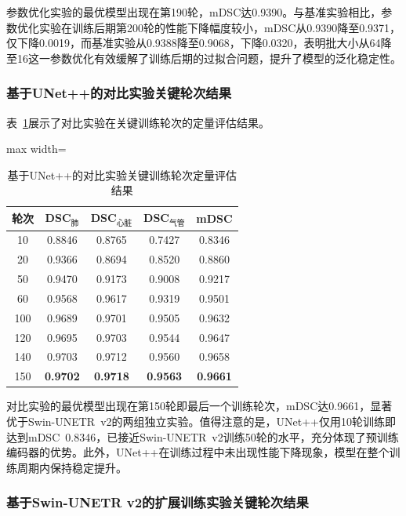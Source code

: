 \documentclass[12pt, a4paper]{article}
\begin{document}
参数优化实验的最优模型出现在第190轮，mDSC达0.9390。与基准实验相比，参数优化实验在训练后期第200轮的性能下降幅度较小，mDSC从0.9390降至0.9371，仅下降0.0019，而基准实验从0.9388降至0.9068，下降0.0320，表明批大小从64降至16这一参数优化有效缓解了训练后期的过拟合问题，提升了模型的泛化稳定性。

\subsubsection{基于UNet++的对比实验关键轮次结果}

表~\ref{tab:results_exp3}展示了对比实验在关键训练轮次的定量评估结果。

\begin{table}[H]
    \centering
    \caption{基于UNet++的对比实验关键训练轮次定量评估结果}
    \label{tab:results_exp3}
    \small
    \begin{adjustbox}{max width=\textwidth}
    \begin{tabular}{@{}ccccc@{}}
        \toprule
        \textbf{轮次} & \textbf{DSC$_\text{肺}$} & \textbf{DSC$_\text{心脏}$} & \textbf{DSC$_\text{气管}$} & \textbf{mDSC} \\
        \midrule
        10 & 0.8846 & 0.8765 & 0.7427 & 0.8346 \\
        20 & 0.9366 & 0.8694 & 0.8520 & 0.8860 \\
        50 & 0.9470 & 0.9173 & 0.9008 & 0.9217 \\
        60 & 0.9568 & 0.9617 & 0.9319 & 0.9501 \\
        100 & 0.9689 & 0.9701 & 0.9505 & 0.9632 \\
        120 & 0.9695 & 0.9703 & 0.9544 & 0.9647 \\
        140 & 0.9703 & 0.9712 & 0.9560 & 0.9658 \\
        150 & \textbf{0.9702} & \textbf{0.9718} & \textbf{0.9563} & \textbf{0.9661} \\
        \bottomrule
    \end{tabular}
    \end{adjustbox}
\end{table}

对比实验的最优模型出现在第150轮即最后一个训练轮次，mDSC达0.9661，显著优于Swin-UNETR~v2的两组独立实验。值得注意的是，UNet++仅用10轮训练即达到mDSC~0.8346，已接近Swin-UNETR~v2训练50轮的水平，充分体现了预训练编码器的优势。此外，UNet++在训练过程中未出现性能下降现象，模型在整个训练周期内保持稳定提升。

\subsubsection{基于Swin-UNETR v2的扩展训练实验关键轮次结果}
\end{document}
